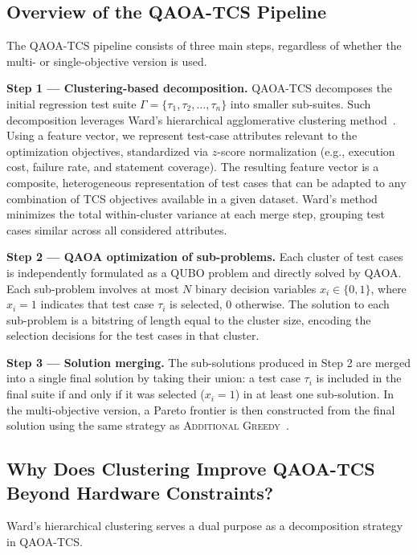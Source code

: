 \subsection{Overview of the QAOA-TCS Pipeline}

The \textsc{QAOA-TCS} pipeline consists of three main steps, regardless of whether the multi- or single-objective version is used.

\textbf{Step 1 — Clustering-based decomposition.} \textsc{QAOA-TCS} decomposes the initial regression test suite $\Gamma = \{\tau_1, \tau_2, \ldots, \tau_n\}$ into smaller sub-suites. Such decomposition leverages Ward's hierarchical agglomerative clustering method~\citep{ward1963clustering}. Using a feature vector, we represent test-case attributes relevant to the optimization objectives, standardized via $z$-score normalization (e.g., execution cost, failure rate, and statement coverage). The resulting feature vector is a composite, heterogeneous representation of test cases that can be adapted to any combination of TCS objectives available in a given dataset. Ward's method minimizes the total within-cluster variance at each merge step, grouping test cases similar across all considered attributes.

\textbf{Step 2 — QAOA optimization of sub-problems.} Each cluster of test cases is independently formulated as a QUBO problem and directly solved by QAOA. Each sub-problem involves at most $N$ binary decision variables $x_i \in \{0, 1\}$, where $x_i = 1$ indicates that test case $\tau_i$ is selected, 0 otherwise. The solution to each sub-problem is a bitstring of length equal to the cluster size, encoding the selection decisions for the test cases in that cluster.

\textbf{Step 3 — Solution merging.} The sub-solutions produced in Step 2 are merged into a single final solution by taking their union: a test case $\tau_i$ is included in the final suite if and only if it was selected ($x_i = 1$) in at least one sub-solution. In the multi-objective version, a Pareto frontier is then constructed from the final solution using the same strategy as \textsc{Additional Greedy}~\citep{yoo2007pareto}.

\subsection{Why Does Clustering Improve QAOA-TCS Beyond Hardware Constraints?}

Ward's hierarchical clustering serves a dual purpose as a decomposition strategy in \textsc{QAOA-TCS}.

